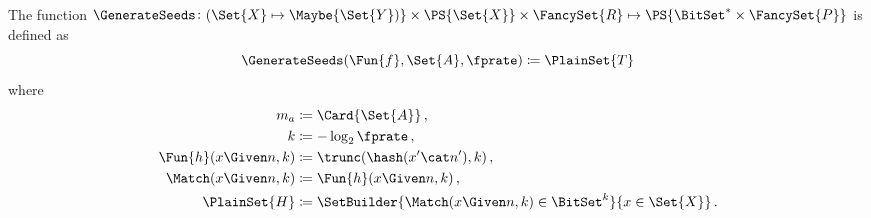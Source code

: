 \documentclass[ ../main.tex]{subfiles}
\begin{document}
The function $\GenerateSeeds \colon (\Set{X} \mapsto \Maybe{\Set{Y})} \times \PS{\Set{X}} \times \FancySet{R} \mapsto \PS{\BitSet^* \times \FancySet{P}}$ is defined as
\begin{equation}
	\GenerateSeeds(\Fun{f}, \Set{A}, \fprate) \coloneqq \PlainSet{T}
	\end{equation}
where
\begin{equation}
\begin{split}
	m_a						&\coloneqq \Card{\Set{A}}\,,\\
	k						&\coloneqq -\log_2 \fprate\,,\\
	\Fun{h}(x \Given n,k)	&\coloneqq \trunc(\hash(x' \cat n'),k)\,,\\	
	\Match(x \Given n,k)	&\coloneqq \Fun{h}(x \Given n,k)\,,\\
	\PlainSet{H} 			&\coloneqq \SetBuilder{\Match(x \Given n,k) \in \BitSet^{k}}{x \in \Set{X}}\,.
\end{split}
\end{equation}
\end{document}

